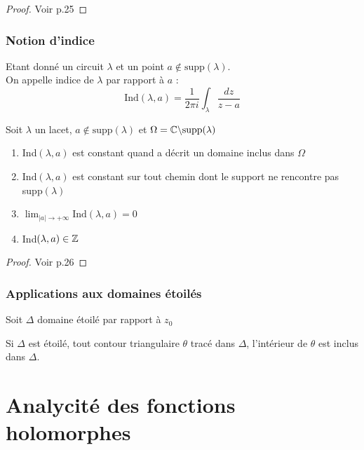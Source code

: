 \documentclass[]{report}
\begin{document}
\begin{proof}{}{}
    Voir p.25
\end{proof}

\subsection{Notion d'indice}

\begin{df}{}{}
    Etant donné un circuit $\lambda$ et un point $a\notin \text{supp}(\lambda)$.\\
    On appelle indice de $\lambda$ par rapport à $a$ : $$\text{Ind}(\lambda,a)=\frac{1}{2\pi i}\int_\lambda\frac{dz}{z-a}$$
\end{df}

\begin{prop}{}{}
Soit $\lambda$ un lacet, $a\notin\text{supp}(\lambda)$ et $\Omega=\mathbb{C}\backslash\text{supp}(\lambda)$
    \begin{enumerate}
        \item Ind$(\lambda,a)$ est constant quand a décrit un domaine inclus dans $\Omega$
        \item $\text{Ind}(\lambda,a)$ est constant sur tout chemin dont le support ne rencontre pas supp$(\lambda)$
        \item $\displaystyle{\lim_{|a|\to+\infty}\text{Ind}(\lambda,a)=0}$
        \item Ind$(\lambda,a)\in\mathbb{Z}$
    \end{enumerate}
\end{prop}

\begin{proof}{}{}
    Voir p.26
\end{proof}

\subsection*{Applications aux domaines étoilés}

Soit $\Delta$ domaine étoilé par rapport à $z_0$

\begin{prop}{}{}
    Si $\Delta$ est étoilé, tout contour triangulaire $\theta$ tracé dans $\Delta$, l'intérieur de $\theta$ est inclus dans $\Delta$.
\end{prop}

\chapter{Analycité des fonctions holomorphes}
\end{document}

